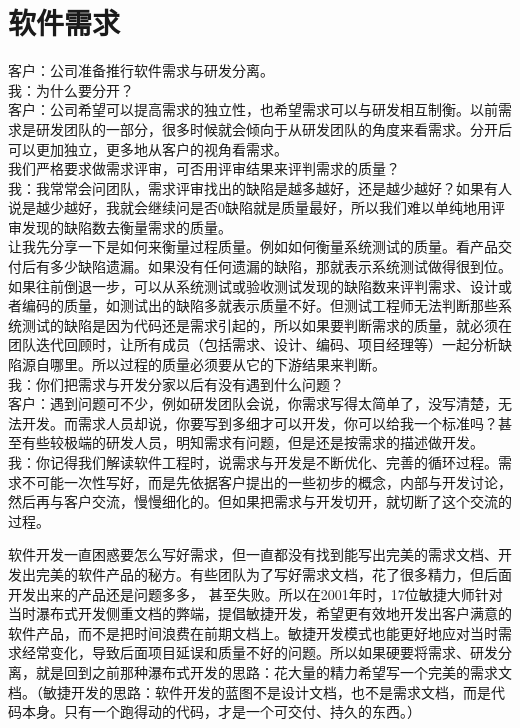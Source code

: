\chapter{软件需求} %
客户：公司准备推行软件需求与研发分离。\\
我：为什么要分开？\\
客户：公司希望可以提高需求的独立性，也希望需求可以与研发相互制衡。以前需求是研发团队的一部分，很多时候就会倾向于从研发团队的角度来看需求。分开后可以更加独立，更多地从客户的视角看需求。\\
我们严格要求做需求评审，可否用评审结果来评判需求的质量？\\
我：我常常会问团队，需求评审找出的缺陷是越多越好，还是越少越好？如果有人说是越少越好，我就会继续问是否0缺陷就是质量最好，所以我们难以单纯地用评审发现的缺陷数去衡量需求的质量。\\
让我先分享一下是如何来衡量过程质量。例如如何衡量系统测试的质量。看产品交付后有多少缺陷遗漏。如果没有任何遗漏的缺陷，那就表示系统测试做得很到位。如果往前倒退一步，可以从系统测试或验收测试发现的缺陷数来评判需求、设计或者编码的质量，如测试出的缺陷多就表示质量不好。但测试工程师无法判断那些系统测试的缺陷是因为代码还是需求引起的，所以如果要判断需求的质量，就必须在团队迭代回顾时，让所有成员（包括需求、设计、编码、项目经理等）一起分析缺陷源自哪里。所以过程的质量必须要从它的下游结果来判断。\\
我：你们把需求与开发分家以后有没有遇到什么问题？\\
客户：遇到问题可不少，例如研发团队会说，你需求写得太简单了，没写清楚，无法开发。而需求人员却说，你要写到多细才可以开发，你可以给我一个标准吗？甚至有些较极端的研发人员，明知需求有问题，但是还是按需求的描述做开发。\\
我：你记得我们解读软件工程时，说需求与开发是不断优化、完善的循环过程。需求不可能一次性写好，而是先依据客户提出的一些初步的概念，内部与开发讨论，然后再与客户交流，慢慢细化的。但如果把需求与开发切开，就切断了这个交流的过程。

软件开发一直困惑要怎么写好需求，但一直都没有找到能写出完美的需求文档、开发出完美的软件产品的秘方。有些团队为了写好需求文档，花了很多精力，但后面开发出来的产品还是问题多多，
甚至失败。所以在2001年时，17位敏捷大师针对当时瀑布式开发侧重文档的弊端，提倡敏捷开发，希望更有效地开发出客户满意的软件产品，而不是把时间浪费在前期文档上。敏捷开发模式也能更好地应对当时需求经常变化，导致后面项目延误和质量不好的问题。所以如果硬要将需求、研发分离，就是回到之前那种瀑布式开发的思路：花大量的精力希望写一个完美的需求文档。（敏捷开发的思路：软件开发的蓝图不是设计文档，也不是需求文档，而是代码本身。只有一个跑得动的代码，才是一个可交付、持久的东西。）

